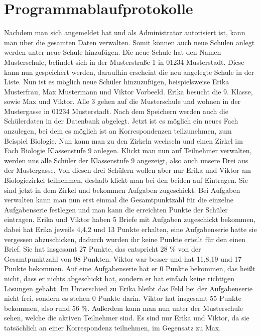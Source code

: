 \chapter{Programmablaufprotokolle}

Nachdem man sich angemeldet hat und als Administrator autorisiert ist, kann man über die gesamten Daten verwalten. Somit können auch neue Schulen anlegt werden unter neue Schule hinzufügen. Die neue Schule hat den Namen Musterschule, befindet sich in der Musterstraße 1 in 01234 Musterstadt. Diese kann nun gespeichert werden, daraufhin erscheint die neu angelegte Schule in der Liste. Nun ist es möglich neue Schüler hinzuzufügen, beispielsweise Erika Musterfrau, Max Mustermann und Viktor Vorbeeld. Erika besucht die 9. Klasse, sowie Max und Viktor. Alle 3 gehen auf die Musterschule und wohnen in der Mustergasse in 01234 Musterstadt. Nach dem Speichern werden auch die Schülerdaten in der Datenbank abgelegt. Jetzt ist es möglich ein neues Fach anzulegen, bei dem es möglich ist an Korrespondenzen teilzunehmen, zum Beispiel Biologie. Nun kann man zu den Zirkeln wechseln und einen Zirkel im Fach Biologie Klassenstufe 9 anlegen. Klickt man nun auf Teilnehmer verwalten, werden uns alle Schüler der Klassenstufe 9 angezeigt, also auch unsere Drei aus der Mustergasse. Von diesen drei Schülern wollen aber nur Erika und Viktor am Biologiezirkel teilnehmen, deshalb klickt man bei den beiden auf Eintragen. Sie sind jetzt in dem Zirkel und bekommen Aufgaben zugeschickt. Bei Aufgaben verwalten kann man nun erst einmal die Gesamtpunktzahl für die einzelne Aufgabenserie festlegen und man kann die erreichten Punkte der Schüler eintragen. Erika und Viktor haben 5 Briefe mit Aufgaben zugeschickt bekommen, dabei hat Erika jeweils 4,4,2 und 13 Punkte erhalten, eine Aufgabenserie hatte sie vergessen abzuschicken, dadurch wurden ihr keine Punkte erteilt für den einen Brief. Sie hat insgesamt 27 Punkte, das entspricht 28 \% von der Gesamtpunktzahl von 98 Punkten. Viktor war besser und hat 11,8,19 und 17 Punkte bekommen. Auf eine Aufgabenserie hat er 0 Punkte bekommen, das heißt nicht, dass er nichts abgeschickt hat, sondern er hat einfach keine richtigen Lösungen gehabt. Im Unterschied zu Erika bleibt das Feld bei der Aufgabenserie nicht frei, sondern es stehen 0 Punkte darin. Viktor hat insgesamt 55 Punkte bekommen, also rund 56 \%. Außerdem kann man nun unter der Musterschule sehen, welche die aktiven Teilnehmer sind. Es sind nur Erika und Viktor, da sie tatsächlich an einer Korrespondenz teilnehmen, im Gegensatz zu Max.